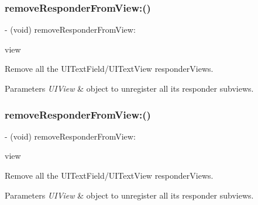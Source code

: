 \subsubsection{\texorpdfstring{remove\+Responder\+From\+View\+:()}{removeResponderFromView:()}\hspace{0.1cm}{\footnotesize\ttfamily [2/3]}}
{\footnotesize\ttfamily -\/ (void) remove\+Responder\+From\+View\+: \begin{DoxyParamCaption}\item[{(nonnull U\+I\+View $\ast$)}]{view }\end{DoxyParamCaption}}

Remove all the U\+I\+Text\+Field/\+U\+I\+Text\+View responder\+View\textquotesingle{}s.


\begin{DoxyParams}{Parameters}
{\em U\+I\+View} & object to unregister all it\textquotesingle{}s responder subviews. \\
\hline
\end{DoxyParams}
\mbox{\label{interface_i_q_keyboard_return_key_handler_a4e0801b53d570d1fb99b7eb82bad4392}} 
\subsubsection{\texorpdfstring{remove\+Responder\+From\+View\+:()}{removeResponderFromView:()}\hspace{0.1cm}{\footnotesize\ttfamily [3/3]}}
{\footnotesize\ttfamily -\/ (void) remove\+Responder\+From\+View\+: \begin{DoxyParamCaption}\item[{(nonnull U\+I\+View $\ast$)}]{view }\end{DoxyParamCaption}}

Remove all the U\+I\+Text\+Field/\+U\+I\+Text\+View responder\+View\textquotesingle{}s.


\begin{DoxyParams}{Parameters}
{\em U\+I\+View} & object to unregister all it\textquotesingle{}s responder subviews. \\
\hline
\end{DoxyParams}
\mbox{\label{interface_i_q_keyboard_return_key_handler_ac88fa6e388c4a0040095bde01c1a721d}} 
